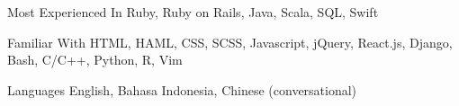 


\begin{cvskills}


  \cvskill
  {Most Experienced In}
  {Ruby, Ruby on Rails, Java, Scala, SQL, Swift}


  \cvskill
  {Familiar With}
  {HTML, HAML, CSS, SCSS, Javascript, jQuery, React.js, Django, Bash, C/C++, Python, R, Vim}


  \cvskill
  {Languages}
  {English, Bahasa Indonesia, Chinese (conversational)}


\end{cvskills}
